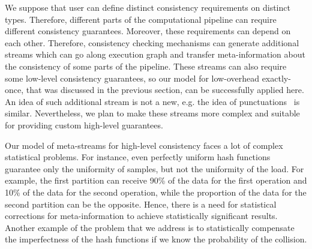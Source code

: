 We suppose that user can define distinct consistency requirements on distinct types. Therefore, different parts of the computational pipeline can require different consistency guarantees. Moreover, these requirements can depend on each other. Therefore, consistency checking mechanisms can generate additional streams which can go along execution graph and transfer meta-information about the consistency of some parts of the pipeline. These streams can also require some low-level consistency guarantees, so our model for low-overhead exactly-once, that was discussed in the previous section, can be successfully applied here. An idea of such additional stream is not a new, e.g. the idea of punctuations~\cite{Tucker:2003:EPS:776752.776780} is similar. Nevertheless, we plan to make these streams more complex and suitable for providing custom high-level guarantees.

Our model of meta-streams for high-level consistency faces a lot of complex statistical problems. For instance, even perfectly uniform hash functions guarantee only the uniformity of samples, but not the uniformity of the load. For example, the first partition can receive 90\% of the data for the first operation and 10\% of the data for the second operation, while the proportion of the data for the second partition can be the opposite. Hence, there is a need for statistical corrections for meta-information to achieve statistically significant results. Another example of the problem that we address is to statistically compensate the imperfectness of the hash functions if we know the probability of the collision.  